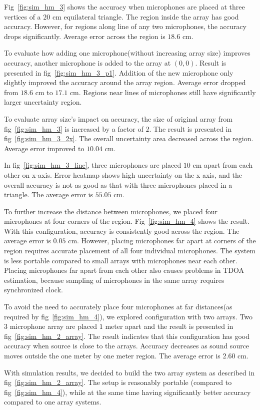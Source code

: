 Fig~\ref{fig:sim_hm_3} shows the accuracy when microphones are placed at three vertices of a $20$ cm equilateral triangle. The region inside the array has good accuracy. However, for regions along line of any two microphones, the accuracy drops significantly. Average error across the region is $18.6$ cm.

To evaluate how adding one microphone(without increasing array size) improves accuracy,  another microphone is added to the array at $(0,0)$. Result is presented in fig~\ref{fig:sim_hm_3_p1}. Addition of the new microphone only slightly improved the accuracy around the array region. Average error dropped from $18.6$ cm to $17.1$ cm. Regions near lines of microphones still have significantly larger uncertainty region.

To evaluate array size's impact on accuracy, the size of original array from fig~\ref{fig:sim_hm_3} is increased by a factor of $2$. The result is presented in fig~\ref{fig:sim_hm_3_2x}. The overall uncertainty area decreased across the region. Average error improved to $10.04$ cm. 

In fig~\ref{fig:sim_hm_3_line}, three microphones are placed $10$ cm apart from each other on x-axis. Error heatmap shows high uncertainty on the x axis, and the overall accuracy is not as good as that with three microphones placed in a triangle. The average error is $55.05$ cm. 

To further increase the distance between microphones, we placed four microphones at four corners of the region. Fig~\ref{fig:sim_hm_4} shows the result. With this configuration, accuracy is consistently good across the region. The average error is $0.05$ cm.  However, placing microphones far apart at corners of the region requires accurate placement of all four individual microphones. The system is less portable compared to small arrays with microphones near each other. Placing microphones far apart from each other also causes problems in TDOA estimation, because sampling of microphones in the same array requires synchronized clock.

To avoid the need to accurately place four microphones at far distances(as required by fig~\ref{fig:sim_hm_4}), we explored configuration with two arrays. Two $3$ microphone array are placed $1$ meter apart and the result is presented in fig~\ref{fig:sim_hm_2_array}.  The result indicates that this configuration has good accuracy when source is close to the arrays. Accuracy decreases as sound source moves outside the one meter by one meter region. The average error is $2.60$ cm. 

With simulation results, we decided to build the two array system as described in fig~\ref{fig:sim_hm_2_array}. The setup is reasonably portable (compared to fig~\ref{fig:sim_hm_4}), while at the same time having significantly better accuracy compared to one array systems.
